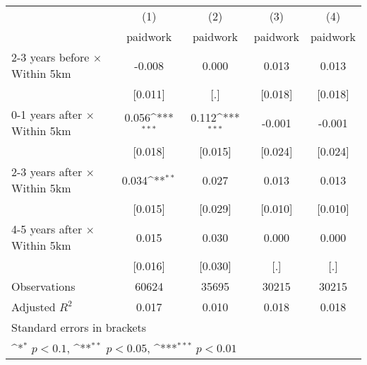 {
\def\sym#1{\ifmmode^{#1}\else\(^{#1}\)\fi}
\begin{tabular}{l*{4}{c}}
\hline\hline
                    &\multicolumn{1}{c}{(1)}&\multicolumn{1}{c}{(2)}&\multicolumn{1}{c}{(3)}&\multicolumn{1}{c}{(4)}\\
                    &\multicolumn{1}{c}{paidwork}&\multicolumn{1}{c}{paidwork}&\multicolumn{1}{c}{paidwork}&\multicolumn{1}{c}{paidwork}\\
\hline
2-3 years before $\times$ Within 5km&      -0.008         &       0.000         &       0.013         &       0.013         \\
                    &     [0.011]         &         [.]         &     [0.018]         &     [0.018]         \\
0-1 years after $\times$ Within 5km&       0.056\sym{***}&       0.112\sym{***}&      -0.001         &      -0.001         \\
                    &     [0.018]         &     [0.015]         &     [0.024]         &     [0.024]         \\
2-3 years after $\times$ Within 5km&       0.034\sym{**} &       0.027         &       0.013         &       0.013         \\
                    &     [0.015]         &     [0.029]         &     [0.010]         &     [0.010]         \\
4-5 years after $\times$ Within 5km&       0.015         &       0.030         &       0.000         &       0.000         \\
                    &     [0.016]         &     [0.030]         &         [.]         &         [.]         \\
\hline
Observations        &       60624         &       35695         &       30215         &       30215         \\
Adjusted \(R^{2}\)  &       0.017         &       0.010         &       0.018         &       0.018         \\
\hline\hline
\multicolumn{5}{l}{\footnotesize Standard errors in brackets}\\
\multicolumn{5}{l}{\footnotesize \sym{*} \(p<0.1\), \sym{**} \(p<0.05\), \sym{***} \(p<0.01\)}\\
\end{tabular}
}
